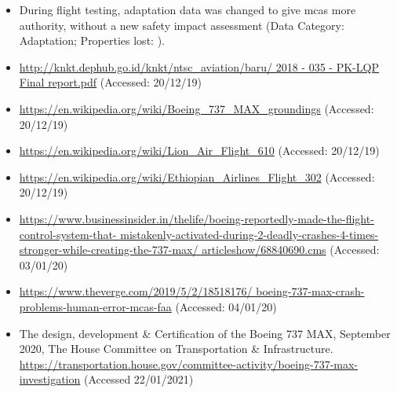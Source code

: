 \begin{itemize}
      However they did not fully report all the issues in the flight logs, and so the maintenance crew's remediation activities did not lead them to suspect an issue with the sensor. (Data Category: Performance, Properties lost: )
    \item During flight testing, \gls{adaptation data} was changed to give \gls{mcas} more authority, without a new safety impact assessment (Data Category: Adaptation; Properties lost: ).
\end{itemize}


\begin{itemize}
    \item \raggedright{\href{http://knkt.dephub.go.id/knkt/ntsc\_aviation/baru/2018\%20-\%20035\%20-\%20PK-LQP\%20Final\%20report.pdf}{http://knkt.dephub.go.id/knkt/ntsc\_aviation/baru/ 2018 - 035 - PK-LQP Final report.pdf} (Accessed: 20/12/19)}
    \item \raggedright{\href{https://en.wikipedia.org/wiki/Boeing\_737\_MAX\_groundings}{https://en.wikipedia.org/wiki/Boeing\_737\_MAX\_groundings} (Accessed: 20/12/19)}
    \item \raggedright{\href{https://en.wikipedia.org/wiki/Lion\_Air\_Flight\_610}{https://en.wikipedia.org/wiki/Lion\_Air\_Flight\_610} (Accessed: 20/12/19)}
    \item \raggedright{\href{https://en.wikipedia.org/wiki/Ethiopian\_Airlines\_Flight\_302}{https://en.wikipedia.org/wiki/Ethiopian\_Airlines\_Flight\_302}  (Accessed: 20/12/19)}
    \item \raggedright{\href{https://www.businessinsider.in/thelife/boeing-reportedly-made-the-flight-control-system-that-mistakenly-activated-during-2-deadly-crashes-4-times-stronger-while-creating-the-737-max/articleshow/68840690.cms}{https://www.businessinsider.in/thelife/boeing-reportedly-made-the-flight-control-system-that- mistakenly-activated-during-2-deadly-crashes-4-times-stronger-while-creating-the-737-max/ articleshow/68840690.cms} (Accessed: 03/01/20)}
    \item \raggedright{\href{https://www.theverge.com/2019/5/2/18518176/boeing-737-max-crash-problems-human-error-mcas-faa}{https://www.theverge.com/2019/5/2/18518176/ boeing-737-max-crash-problems-human-error-mcas-faa} (Accessed: 04/01/20)}
    \item The design, development \& Certification of the Boeing 737 MAX, September 2020, The House Committee on Transportation \& Infrastructure. \href{https://transportation.house.gov/committee-activity/boeing-737-max-investigation}{https://transportation.house.gov/committee-activity/boeing-737-max-investigation} (Accessed 22/01/2021)
\end{itemize}

